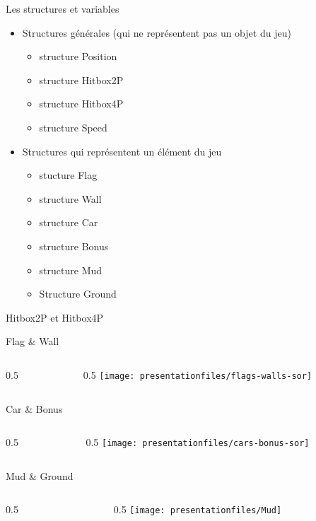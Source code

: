 \documentclass[10pt,dvipsnames,final]{beamer}
\newcommand{\midcolumn}[2]{
\begin{columns}
	\begin{column}{0.5\textwidth}
		#1
	\end{column}
	\begin{column}{0.5\textwidth}
		#2
	\end{column}
\end{columns}
}
\begin{document}
\begin{frame}{Les structures et variables}
\begin{itemize}
\item Structures générales (qui ne représentent pas un objet du jeu)
\begin{itemize}
\item structure Position
\item structure Hitbox2P
\item structure Hitbox4P
\item structure Speed
\end{itemize}
\item Structures qui représentent un élément du jeu
\begin{itemize}
\item stucture Flag
\item structure Wall
\item structure Car
\item structure Bonus
\item structure Mud
\item Structure Ground
\end{itemize}
\end{itemize}
\end{frame}

\begin{frame}{Hitbox2P et Hitbox4P}


\end{frame}

\begin{frame}{Flag \& Wall}
\midcolumn{}{\texttt{[image: presentationfiles/flags-walls-sor]}}
\end{frame}

\begin{frame}{Car \& Bonus}
\midcolumn{}{\texttt{[image: presentationfiles/cars-bonus-sor]}}
\end{frame}

\begin{frame}{Mud \& Ground}
\midcolumn{}{\texttt{[image: presentationfiles/Mud]}}
\end{frame}
\end{document}

